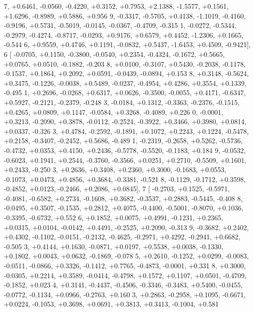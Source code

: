 \begin{DoxyCode}
      7, +0.6461, -0.0560, -0.4220, +0.3152, +0.7953, +2.1388, -1.5577, +0.1561, +1.6296, -0.8989, +0.5886, +0.956
      9, -0.3317, -0.5705, +0.4138, -1.1019, -0.4160, -0.9196, +0.5731, -0.5019, -0.0145, -0.0367, -0.4709, -0.315
      1, -0.0272, -0.5344, -0.2979, -0.4274, -0.8717, -0.0293, +0.9176, +0.6579, +0.4452, -1.2306, +0.1665, -0.544
      6, +0.9559, +0.4746, +0.1191, -0.0832, +0.5437, -1.6453, +0.4509, -0.9421],
6 [ -0.0705, +0.1150, -0.3800, -0.0540, +0.2354, -0.4324, -0.1672, +0.5665, +0.0765, +0.0510, -0.1882, -0.203
      8, +0.0100, -0.3107, +0.5430, -0.2038, -0.1178, -0.1537, +0.1864, +0.2092, +0.0591, -0.0439, -0.0894, +0.153
      8, +0.3148, -0.5624, +0.3475, -0.1226, -0.0038, +0.5489, -0.0237, -0.4954, +0.4286, +0.3554, +0.1339, -0.495
      1, +0.2696, -0.0268, +0.6317, +0.0626, -0.3500, -0.0055, +0.4171, -0.6347, +0.5927, -0.2121, -0.2379, -0.248
      3, -0.0184, +0.1312, -0.3363, -0.2376, -0.1515, +0.4265, +0.0809, +0.1147, -0.0584, +0.3268, -0.4089, +0.226
      0, -0.0001, +0.3213, -0.2090, +0.3878, -0.0112, -0.2524, -0.3922, +0.3466, +0.3980, +0.0814, +0.0337, -0.326
      3, +0.4784, -0.2592, -0.1891, +0.1072, +0.2243, +0.1224, -0.5478, +0.2158, -0.3407, -0.2452, +0.5686, -0.489
      1, -0.2319, -0.2658, +0.5262, -0.5736, -0.4732, +0.0353, +0.4150, +0.2436, -0.5778, -0.5520, -0.1183, +0.184
      9, -0.0532, -0.6023, +0.1941, +0.2544, -0.3760, -0.3566, +0.0251, +0.2710, -0.5509, +0.1601, +0.2433, -0.250
      3, +0.2636, +0.3408, +0.2360, +0.3000, -0.1683, +0.0553, -0.1073, +0.0473, +0.4856, +0.3684, -0.3381, -0.521
      8, -0.1129, -0.1712, +0.3598, -0.4852, +0.0123, -0.2466, +0.2086, +0.0845],
7 [ -0.2703, +0.1525, -0.5971, -0.4081, -0.6582, +0.2734, -0.1608, +0.3682, -0.3537, +0.2883, -0.5445, -0.408
      8, -0.0495, +0.3507, -0.1535, +0.2812, +0.4075, -0.4400, -0.5001, -0.8070, +0.1036, -0.3395, -0.6732, +0.552
      6, +0.1852, +0.0075, +0.4991, -0.1231, +0.2365, +0.0315, +0.0104, -0.0142, +0.4491, -0.2525, +0.2090, -0.313
      9, -0.3682, +0.2402, +0.4302, -0.1102, -0.0151, -0.2132, -0.4625, -0.2971, +0.4292, -0.2941, +0.6682, -0.505
      3, +0.4144, +0.1630, -0.0871, +0.0197, +0.5538, +0.0038, -0.1330, +0.1802, +0.0043, +0.0632, -0.1869, -0.078
      5, +0.2610, -0.1252, +0.0299, -0.0083, -0.0511, -0.0866, +0.3326, -0.1412, +0.7765, -0.4873, -0.0001, +0.331
      8, +0.3000, -0.0305, +0.2214, +0.3589, -0.0414, -0.4798, +0.1572, +0.1107, +0.0501, -0.4709, -0.1852, +0.023
      4, +0.3141, -0.4437, -0.4506, -0.3346, -0.3483, +0.5400, -0.0455, -0.0772, -0.1134, +0.0966, -0.2763, +0.160
      3, +0.2863, -0.2958, +0.1095, -0.6671, +0.0224, -0.1053, +0.3698, +0.0691, +0.3813, +0.3413, -0.1004, +0.581

\end{DoxyCode}
